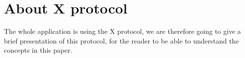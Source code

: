 \chapter{About X protocol}
The whole application is using the X protocol\cite{x-protocol}, 
we are therefore going to give a brief presentation of this protocol, 
for the reader to be able to understand the concepts in this paper.
%

%

%

%

%

